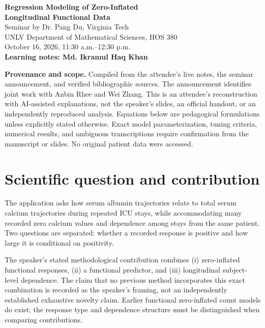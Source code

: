 \documentclass[11pt]{article}
\begin{document}
\begin{center}
{\LARGE\bfseries Regression Modeling of Zero-Inflated\\[3pt] Longitudinal Functional Data}\\[10pt]
{\large Seminar by Dr. Pang Du, Virginia Tech}\\
UNLV Department of Mathematical Sciences, HOS 380\\
October 16, 2026, 11:30 a.m.--12:30 p.m.\\[8pt]
\textbf{Learning notes: Md. Ikramul Haq Khan}
\end{center}
\textbf{Provenance and scope.} Compiled from the attendee's live notes, the seminar announcement, and verified bibliographic sources. The announcement identifies joint work with Anbin Rhee and Wei Zhang. This is an attendee's reconstruction with AI-assisted explanations, not the speaker's slides, an official handout, or an independently reproduced analysis. Equations below are pedagogical formulations unless explicitly stated otherwise. Exact model parameterization, tuning criteria, numerical results, and ambiguous transcriptions require confirmation from the manuscript or slides. No original patient data were accessed.
\tableofcontents
\section{Scientific question and contribution}
The application asks how serum albumin trajectories relate to total serum calcium trajectories during repeated ICU stays, while accommodating many recorded zero calcium values and dependence among stays from the same patient. Two questions are separated: whether a recorded response is positive and how large it is conditional on positivity.

The speaker's stated methodological contribution combines (i) zero-inflated functional responses, (ii) a functional predictor, and (iii) longitudinal subject-level dependence. The claim that no previous method incorporates this exact combination is recorded as the speaker's framing, not an independently established exhaustive novelty claim. Earlier functional zero-inflated count models do exist; the response type and dependence structure must be distinguished when comparing contributions.
\end{document}
